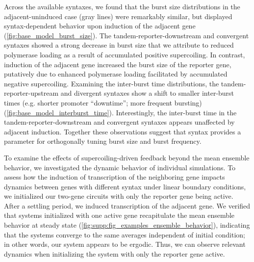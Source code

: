 \documentclass[11pt]{article}
\begin{document}
Across the available syntaxes, we found that the burst size distributions in the adjacent-uninduced case (gray lines) were remarkably similar, but displayed syntax-dependent behavior upon induction of the adjacent gene (\cref{fig:base_model_burst_size}). The tandem-reporter-downstream and convergent syntaxes showed a strong decrease in burst size that we attribute to reduced polymerase loading as a result of accumulated positive supercoiling. In contrast, induction of the adjacent gene increased the burst size of the reporter gene, putatively due to enhanced polymerase loading facilitated by accumulated negative supercoiling. Examining the inter-burst time distributions, the tandem-reporter-upstream and divergent syntaxes show a shift to smaller inter-burst times (e.g. shorter promoter ``downtime''; more frequent bursting) (\cref{fig:base_model_interburst_time}). Interestingly, the inter-burst time in the tandem-reporter-downstream and convergent syntaxes appears unaffected by adjacent induction. Together these observations suggest that syntax provides a parameter for orthogonally tuning burst size and burst frequency.


To examine the effects of supercoiling-driven feedback beyond the mean ensemble behavior, we investigated the dynamic behavior of individual simulations. To assess how the induction of transcription of the neighboring gene impacts dynamics between genes with different syntax under linear boundary conditions,
we initialized our two-gene circuits with only the reporter gene being active. After a settling period, we induced transcription of the adjacent gene.
We verified that systems initialized with one active gene recapitulate the mean ensemble behavior at steady state (\cref{fig:supp:fig_examples_ensemble_behavior}), indicating that the systems converge to the same averages independent of initial condition; in other words, our system appears to be ergodic. Thus, we can observe relevant dynamics when initializing the system with only the reporter gene active.
\end{document}
